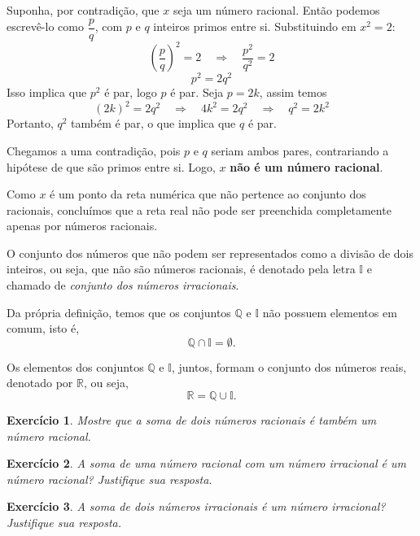 \documentclass[12pt]{book}
\newtheorem{exer}{Exerc\'icio}[section]
\begin{document}
Suponha, por contradição, que $x$ seja um número racional. Então podemos escrevê-lo como $\dfrac{p}{q}$, com $p$ e $q$ inteiros primos entre si. Substituindo em $x^2 = 2$:
\[
\left(\frac{p}{q}\right)^2 = 2 
\quad\Rightarrow\quad 
\frac{p^2}{q^2} = 2
\]
\[
p^2 = 2q^2
\]
Isso implica que $p^2$ é par, logo $p$ é par. Seja $p = 2k$, assim temos
\[
(2k)^2 = 2q^2 
\quad\Rightarrow\quad 
4k^2 = 2q^2 
\quad\Rightarrow\quad 
q^2 = 2k^2
\]
Portanto, $q^2$ também é par, o que implica que $q$ é par.

Chegamos a uma contradição, pois $p$ e $q$ seriam ambos pares, contrariando a hipótese de que são primos entre si. Logo, $x$ \textbf{não é um número racional}.

Como $x$ é um ponto da reta numérica que não pertence ao conjunto dos racionais, concluímos que a reta real não pode ser preenchida completamente apenas por números racionais.

O conjunto dos números que não podem ser representados como a divisão de dois inteiros, ou seja, que não são números racionais, é denotado pela letra $\mathbb{I}$ e chamado de \emph{conjunto dos números irracionais}.


Da própria definição, temos que os conjuntos $\mathbb{Q}$ e $\mathbb{I}$ não possuem elementos em comum, isto é,
\[
\mathbb{Q} \cap \mathbb{I} = \emptyset.
\]

Os elementos dos conjuntos $\mathbb{Q}$ e $\mathbb{I}$, juntos, formam o conjunto dos números reais, denotado por $\mathbb{R}$, ou seja,
\[
\mathbb{R} = \mathbb{Q} \cup \mathbb{I}.
\]


\begin{exer}
	Mostre que a soma de dois números racionais é também um número racional.
\end{exer}
\begin{exer}
	A soma de uma número racional com um número irracional é um número racional? Justifique sua resposta.
\end{exer}
\begin{exer}
	A soma de dois números irracionais é um número irracional? Justifique sua resposta.
\end{exer}




	
	
	
	
	
	
\end{document}
